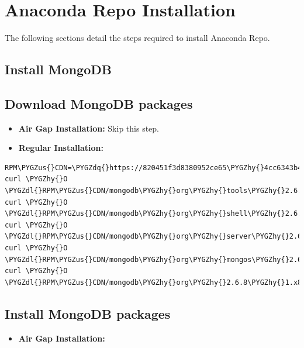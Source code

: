 \documentclass[letterpaper,10pt,openany,oneside]{sphinxmanual}
\def\PYGZus{\char`\_}
\def\PYGZdl{\char`\$}
\def\PYGZhy{\char`\-}
\def\PYGZdq{\char`\"}
\begin{document}
\section{Anaconda Repo Installation}
\label{AnacondaRepository:anaconda-repo-installation}
The following sections detail the steps required to install Anaconda
Repo.


\subsection{Install MongoDB}
\label{AnacondaRepository:install-mongodb}

\subsection{Download MongoDB packages}
\label{AnacondaRepository:download-mongodb-packages}\begin{itemize}
\item {} 
\textbf{Air Gap Installation:} Skip this step.

\item {} 
\textbf{Regular Installation:}

\end{itemize}

\begin{Verbatim}[commandchars=\\\{\}]
RPM\PYGZus{}CDN=\PYGZdq{}https://820451f3d8380952ce65\PYGZhy{}4cc6343b423784e82fd202bb87cf87cf.ssl.cf1.rackcdn.com\PYGZdq{}
curl \PYGZhy{}O \PYGZdl{}RPM\PYGZus{}CDN/mongodb\PYGZhy{}org\PYGZhy{}tools\PYGZhy{}2.6.8\PYGZhy{}1.x86\PYGZus{}64.rpm
curl \PYGZhy{}O \PYGZdl{}RPM\PYGZus{}CDN/mongodb\PYGZhy{}org\PYGZhy{}shell\PYGZhy{}2.6.8\PYGZhy{}1.x86\PYGZus{}64.rpm
curl \PYGZhy{}O \PYGZdl{}RPM\PYGZus{}CDN/mongodb\PYGZhy{}org\PYGZhy{}server\PYGZhy{}2.6.8\PYGZhy{}1.x86\PYGZus{}64.rpm
curl \PYGZhy{}O \PYGZdl{}RPM\PYGZus{}CDN/mongodb\PYGZhy{}org\PYGZhy{}mongos\PYGZhy{}2.6.8\PYGZhy{}1.x86\PYGZus{}64.rpm
curl \PYGZhy{}O \PYGZdl{}RPM\PYGZus{}CDN/mongodb\PYGZhy{}org\PYGZhy{}2.6.8\PYGZhy{}1.x86\PYGZus{}64.rpm
\end{Verbatim}


\subsection{Install MongoDB packages}
\label{AnacondaRepository:install-mongodb-packages}\begin{itemize}
\item {} 
\textbf{Air Gap Installation:}

\end{itemize}
\end{document}
